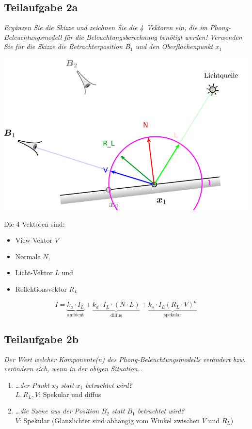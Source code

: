 \documentclass[a4paper]{scrartcl}
\begin{document}
\subsection*{Teilaufgabe 2a}
\textit{Ergänzen Sie die Skizze und zeichnen Sie die 4~Vektoren ein, die im
Phong-Beleuchtungsmodell für die Beleuchtungsberechnung benötigt werden!
Verwenden Sie für die Skizze die Betrachterposition $B_1$ und den
Oberflächenpunkt $x_1$}

\includegraphics*[width=0.8\linewidth, keepaspectratio]{2a.png}

Die 4 Vektoren sind:

\begin{itemize}
    \item View-Vektor $V$
    \item Normale $N$,
    \item Licht-Vektor $L$ und
    \item Reflektionsvektor $R_L$
\end{itemize}

\[I = \underbrace{k_a \cdot I_L}_{\text{ambient}} + \underbrace{k_d \cdot I_L \cdot (N \cdot L)}_{\text{diffus}} + \underbrace{k_s \cdot I_L (R_L \cdot V)^n}_{\text{spekular}}\]

\subsection*{Teilaufgabe 2b}
\textit{Der Wert welcher Komponente(n) des Phong-Beleuchtungsmodells verändert
bzw. verändern sich, wenn in der obigen Situation\dots}

\begin{enumerate}[label=(\roman*)]
    \item \textit{\dots der Punkt $x_2$ statt $x_1$ betrachtet wird?}\\
          $L, R_L, V$: Spekular und diffus
    \item \textit{\dots die Szene aus der Position $B_2$ statt $B_1$ betrachtet wird?}\\
          $V$: Spekular (Glanzlichter sind abhängig vom Winkel zwischen $V$ und $R_L$)
\end{enumerate}
\end{document}
